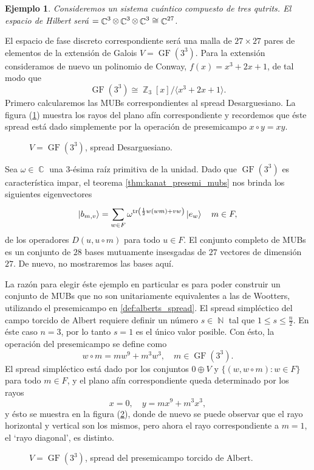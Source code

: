 \documentclass[a4paper]{report}
\DeclareMathOperator{\C}{\mathbb{C}}
\DeclareMathOperator{\N}{\mathbb{N}}
\DeclareMathOperator{\Z}{\mathbb{Z}}
\let\H\relax
\DeclareMathOperator{\H}{\mathcal H}
\DeclareMathOperator{\tr}{tr}
\DeclareMathOperator{\GF}{GF}
\newtheorem{example}{Ejemplo}
\begin{document}
  \begin{example}
    Consideremos un sistema cuántico compuesto de tres
    qutrits. El espacio de Hilbert será $\H = \C^{3} \otimes
    \C^{3} \otimes \C^{3} \cong \C^{27}$.   
    \label{ex:qs-3-3}
  \end{example}
  El espacio de fase discreto correspondiente será una malla
  de $27 \times 27$ pares de elementos de la extensión de
  Galois $V = \GF(3^{3})$. Para la extensión consideramos de
  nuevo un polinomio de Conway, $f(x) = x^3 + 2x + 1$, de
  tal modo que
  \[
    \GF(3^{3}) \cong \Z_3[x] / \langle x^3+2x+1 \rangle.
  \] 
  Primero calcularemos las MUBs correspondientes al spread
  Desarguesiano. La figura
  (\ref{fig:3-3-desarguesian-plane}) muestra los rayos del
  plano afín correspondiente y recordemos que éste spread
  está dado simplemente por la operación de presemicampo $x
  \circ y = xy$.
  \begin{figure}[ht]
    \centering
    
    \caption{$V = \GF(3^{3})$, spread Desarguesiano.}
    \label{fig:3-3-desarguesian-plane}
  \end{figure}
  Sea $\omega \in \C$ una $3$-ésima raíz primitiva de la
  unidad. Dado que $\GF(3^3)$ es característica impar, el
  teorema \ref{thm:kanat_presemi_mubs} nos brinda los
  siguientes eigenvectores
  \begin{equation}
    \ket{b_{m,v}}
    = \sum_{w \in F}^{}
    \omega^{\tr\left(
        \frac{1}{2} w(wm) + vw
    \right) } \ket{e_w}
    \quad m \in F,
  \end{equation}
  de los operadores $D(u,u \circ m)$ para todo $u \in F$. El
  conjunto completo de MUBs es un conjunto de $28$ bases
  mutuamente insesgadas de $27$ vectores de dimensión $27$.
  De nuevo, no mostraremos las bases aquí.

  La razón para elegir éste ejemplo en particular es para
  poder construir un conjunto de MUBs que no son
  unitariamente equivalentes a las de Wootters, utilizando
  el presemicampo en \ref{def:alberts_spread}. El spread
  simpléctico del campo torcido de Albert requiere definir
  un número $s \in \N$ tal que $1 \leq s \leq \frac{n}{2}$.
  En éste caso $n = 3$, por lo tanto $s = 1$ es el único
  valor posible. Con ésto, la operación del presemicampo se
  define como
  \[
    w \circ m
    = m w^{9} + m^{3}w^{3},
    \quad m \in \GF(3^{3}).
  \] 
  El spread simpléctico está dado por los conjuntos $0
  \oplus V$ y $\{(w,w\circ m) : w \in F\}$ para todo $m \in
  F$, y el plano afín correspondiente queda determinado por
  los rayos
  \[
    x = 0,
    \quad
    y = mx^{9} + m^3 x^3,
  \] 
  y ésto se muestra en la figura
  (\ref{fig:3-3-albert-plane}), donde de nuevo se puede
  observar que el rayo horizontal y vertical son los mismos,
  pero ahora el rayo correspondiente a $m = 1$, el `rayo
  diagonal', es distinto.
  \begin{figure}[ht]
    \centering
    
    \caption{$V = \GF(3^{3})$, spread del presemicampo
    torcido de Albert.}
    \label{fig:3-3-albert-plane}
  \end{figure}
\end{document}
